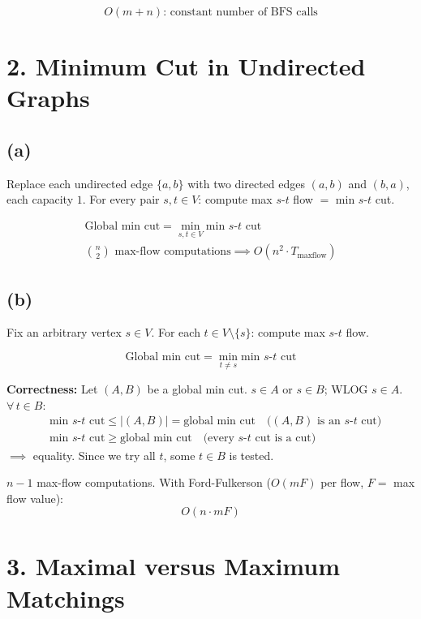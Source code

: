 \documentclass[11pt]{article}
\begin{document}
\[\boxed{O(m + n) \text{: constant number of BFS calls}}\]


\section*{2. Minimum Cut in Undirected Graphs}

\vspace{-10pt}
\subsection*{(a)}

Replace each undirected edge $\{a,b\}$ with two directed edges $(a,b)$ and $(b,a)$, each capacity $1$. For every pair $s, t \in V$: compute max $s$-$t$ flow $=$ min $s$-$t$ cut.

\begin{gather*}
\text{Global min cut} = \min_{s,t \in V} \text{min } s\text{-}t \text{ cut} \\
\binom{n}{2} \text{ max-flow computations} \implies \boxed{O(n^2 \cdot T_{\text{maxflow}})}
\end{gather*}


\vspace{-20pt}
\subsection*{(b)}

Fix an arbitrary vertex $s \in V$. For each $t \in V \setminus \{s\}$: compute max $s$-$t$ flow.

\[
\text{Global min cut} = \min_{t \ne s} \text{min } s\text{-}t \text{ cut}
\]

\textbf{Correctness:} Let $(A, B)$ be a global min cut. $s \in A$ or $s \in B$; WLOG $s \in A$. $\forall\, t \in B$:
\begin{align*}
&\text{min } s\text{-}t \text{ cut} \le |(A,B)| = \text{global min cut} \quad \text{($(A,B)$ is an $s$-$t$ cut)} \\
&\text{min } s\text{-}t \text{ cut} \ge \text{global min cut} \quad \text{(every $s$-$t$ cut is a cut)}
\end{align*}
$\implies$ equality. Since we try all $t$, some $t \in B$ is tested.

$n - 1$ max-flow computations. With Ford-Fulkerson ($O(mF)$ per flow, $F = $ max flow value):
\[\boxed{O(n \cdot mF)}\]


\section*{3. Maximal versus Maximum Matchings}
\end{document}
